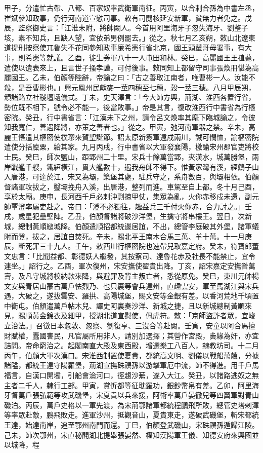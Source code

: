 \begin{pinyinscope}
 甲子，分遣忙古帶、八都、百家奴率武衛軍南征。丙寅，以合剌合孫為中書左丞，崔斌參知政事，仍行河南道宣慰司事。敕有司閱核延安新軍，貧無力者免之。戊辰，監察御史言：「江淮未附，將帥闕人。今首用阿里海牙子忽失海牙、劉整子垓，素不知兵，且缺人望，宜依弟男例罷去。」從之。秋七月乙亥朔，敕山北遼東道提刑按察使兀魯失不花同參知政事廉希憲行省北京，國王頭輦哥毋署事，有大事，則希憲等就議。乙酉，徙生券軍八十一人屯田和林。癸巳，高麗國王王禃薨，遣使以遺表來上，且言世子搔孝謹，可付後事。敕同知上都留守司事張煥冊愖為高麗國王。乙未，伯顏等陛辭，帝諭之曰：「古之善取江南者，唯曹彬一人。汝能不殺，是吾曹彬也。」興元鳳州民獻麥一莖四穗至七穗，穀一莖三穗。八月甲辰朔，頒諸路立社稷壇壝儀式。丁未，史天澤言：「今大師方興，荊湖、淮西各置行省，勢位既不相下，號令必不能一，後當敗事。」帝是其言，復改淮西行中書省為行樞密院。癸丑，行中書省言：「江漢未下之州，請令呂文煥率其麾下臨城諭之，令彼知我寬仁，善遇降將，亦策之善者也。」從之。甲寅，弛河南軍器之禁。辛未，高麗王愖遣其樞密使樸璆來賀聖誕節。詔太原新簽軍遠戍兩川，誠可憫恤，諭樞密院遣使分括廩粟，給其家。九月丙戌，行中書省以大軍發襄陽，檄諭宋州郡官吏將校士民。癸巳，師次鹽山，距郢州二十里。宋兵十餘萬當郢，夾漢水，城萬勝堡，兩岸戰艦千艘，鐵絙橫江，貫大艦數十，遏我舟師不得下。惟黃家灣有溪，經鷂子山入唐港，可達於江，宋又為壩，築堡其處，駐兵守之，系舟數百，與壩相依。伯顏督諸軍攻拔之，鑿壩挽舟入溪，出唐港，整列而進。車駕至自上都。冬十月己酉，享於太廟。庚申，長河西千戶必剌沖剽掠甲仗，集眾為亂，火你赤移戍未還，副元帥覃澄率屬吏赴之。帝曰：「澄不必獨往，趣益兵三千付火你赤，合力討之。」壬戌，歲星犯壘壁陣。乙丑，伯顏督諸將破沙洋堡，生擒守將串樓王。翌日，次新城，總制黃順縋城降。伯顏遣順招都統邊居誼，不出，總管李庭破其外堡，諸軍蟻附而登，拔之，居誼自焚死。辛未，賜北平王南木合馬三萬、羊十萬。十一月庚辰，斷死罪三十九人。壬午，敕西川行樞密院也速帶兒取嘉定府。癸未，符寶郎董文忠言：「比聞益都、彰德妖人繼發，其按察司、達魯花赤及社長不能禁止，宜令連坐。」詔行之。乙酉，軍次復州，宋安撫使翟貴出降。丁亥，詔宋嘉定安撫昝萬壽，及凡守城將校納款來降，與避罪及背主叛亡者，悉從原免。癸巳，東川元帥楊文安與青居山蒙古萬戶怯烈乃、也只裏等會兵達州，直趣雲安，軍至馬湖江與宋兵遇，大破之，遂拔雲安、羅拱、高陽城堡，賜文安等金銀有差。以香河荒地千頃置中衛屯。伯顏遣萬戶帖木兒、譯史阿裏奏沙洋、新城之捷，且以新城總制黃順來見，賜順黃金錦衣及細甲，授湖北道宣慰使，佩虎符。敕：「京師盜詐者眾，宜峻立治法。」召徵日本忽敦、忽察、劉復亨、三沒合等赴闕。壬寅，安童以阿合馬擅財賦權，蠹國害民，凡官屬所用非人，請別加選擇；其營作宮殿，夤緣為奸，亦宜詰問。帝命窮治之。起閣南直大殿及東西殿，增選樂工八百人，隸教坊司。十二月丙午，伯顏大軍次漢口。宋淮西制置使夏貴，都統高文明、劉儀以戰船萬艘，分據諸隘，都統王達守陽羅堡，荊湖宣撫硃禩孫以游擊軍厄中流，師不得進。用千戶馬福言，自漢口開壩，引船會淪河口，徑趨沙蕪，遂入大江。癸丑，以諸路逃奴之無主者二千人，隸行工部。甲寅，賞忻都等征耽羅功，銀鈔幣帛有差。乙卯，阿里海牙督萬戶張弘範等攻武磯堡，宋夏貴以兵來援，阿術率萬戶晏徹兒等四翼軍對青山磯泊。丙辰，萬戶史格以一軍先渡，為宋荊鄂諸軍都統程鵬飛所敗，總管史塔剌渾等率眾赴敵，鵬飛敗走。進軍沙州，抵觀音山，夏貴東走，遂破武磯堡，斬宋都統王達，始達南岸，追至鄂州南門而還。丁巳，伯顏登武磯山，宋硃禩孫遁歸江陵。己未，師次鄂州，宋直秘閣湖北提舉張晏然、權知漢陽軍王儀、知德安府來興國並以城降，程
\end{pinyinscope}
